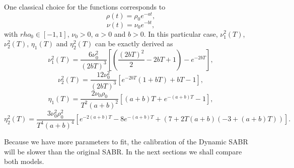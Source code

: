 One classical choice for the functions corresponds to~\cite{Fernandez}
\begin{equation}
\rho(t)=\rho_0e^{-at},
\end{equation}
\begin{equation}
\nu(t)=\nu_0e^{-bt},
\end{equation}
\noindent with $rho_0\in[-1,1]$, $\nu_0>0$, $a>0$ and $b>0$.
In this particular case, $\nu_1^2(T)$, $\nu_2^2(T)$, $\eta_1(T)$ and $\eta_2^2(T)$ can be exactly derived as
\begin{equation}
\nu_1^2(T)=\frac{6\nu_0^2}{(2bT)^3}\left[\left(\frac{(2bT)^2}{2}-2bT+1\right)-e^{-2bT}\right],
\end{equation}
\begin{equation}
\nu_2^2(T)=\frac{12\nu_0^2}{(2bT)^3}\left[e^{-2bT}(1+bT)+bT-1\right],
\end{equation}
\begin{equation}
\eta_1(T)=\frac{2\nu_0\rho_0}{T^2(a+b)^2}\left[(a+b)T+e^{-(a+b)T}-1\right],
\end{equation}
\begin{equation}
\eta_2^2(T)=\frac{3\nu_0^2\rho_0^2}{T^4(a+b)^4}\left[e^{-2(a+b)T}-8e^{-(a+b)T}+(7+2T(a+b)(-3+(a+b)T))\right].
\end{equation}

Because we have more parameters to fit, the calibration of the Dynamic SABR will be slower than the original SABR. In the next sections we shall compare both models.